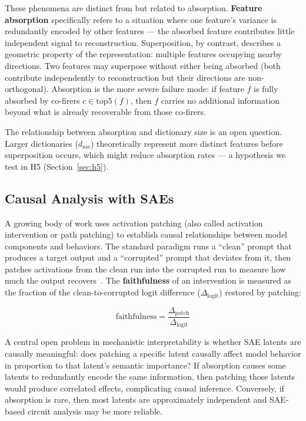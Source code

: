 \documentclass{article}
\begin{document}
These phenomena are distinct from but related to absorption. \textbf{Feature absorption} specifically refers to a situation where one feature's variance is redundantly encoded by other features --- the absorbed feature contributes little independent signal to reconstruction. Superposition, by contrast, describes a geometric property of the representation: multiple features occupying nearby directions. Two features may superpose without either being absorbed (both contribute independently to reconstruction but their directions are non-orthogonal). Absorption is the more severe failure mode: if feature $f$ is fully absorbed by co-firers $c \in \text{top5}(f)$, then $f$ carries no additional information beyond what is already recoverable from those co-firers.

The relationship between absorption and dictionary size is an open question. Larger dictionaries ($d_{\text{sae}}$) theoretically represent more distinct features before superposition occurs, which might reduce absorption rates --- a hypothesis we test in H5 (Section~\ref{sec:h5}).

\subsection{Causal Analysis with SAEs}

A growing body of work uses activation patching (also called activation intervention or path patching) to establish causal relationships between model components and behaviors. The standard paradigm runs a ``clean'' prompt that produces a target output and a ``corrupted'' prompt that deviates from it, then patches activations from the clean run into the corrupted run to measure how much the output recovers~\citep{wang2022,meng2022}. The \textbf{faithfulness} of an intervention is measured as the fraction of the clean-to-corrupted logit difference ($\Delta_{\text{logit}}$) restored by patching:

\begin{equation}
\text{faithfulness} = \frac{\Delta_{\text{patch}}}{\Delta_{\text{logit}}}
\end{equation}

A central open problem in mechanistic interpretability is whether SAE latents are causally meaningful: does patching a specific latent causally affect model behavior in proportion to that latent's semantic importance? If absorption causes some latents to redundantly encode the same information, then patching those latents would produce correlated effects, complicating causal inference. Conversely, if absorption is rare, then most latents are approximately independent and SAE-based circuit analysis may be more reliable.
\end{document}
